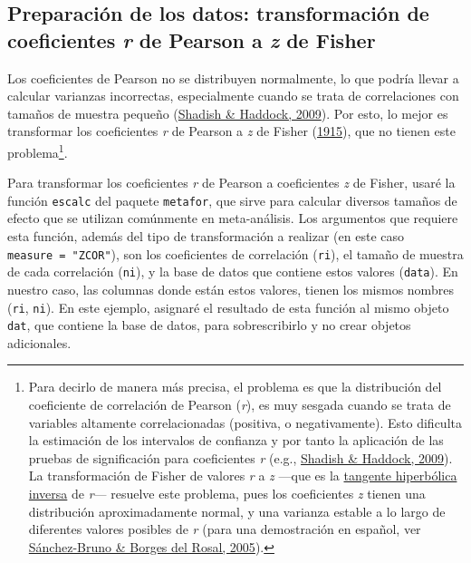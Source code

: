 \documentclass[
  bookmarksnumbered]{article}
\begin{document}
\hypertarget{preparaciuxf3n-de-los-datos-transformaciuxf3n-de-coeficientes-r-de-pearson-a-z-de-fisher}{%
\subsection{\texorpdfstring{Preparación de los datos: transformación de coeficientes \emph{r} de Pearson a \emph{z} de Fisher}{Preparación de los datos: transformación de coeficientes r de Pearson a z de Fisher}}\label{preparaciuxf3n-de-los-datos-transformaciuxf3n-de-coeficientes-r-de-pearson-a-z-de-fisher}}

Los coeficientes de Pearson no se distribuyen normalmente, lo que podría llevar a calcular varianzas incorrectas, especialmente cuando se trata de correlaciones con tamaños de muestra pequeño (\protect\hyperlink{ref-shadishCombiningEstimatesEffect2009}{Shadish \& Haddock, 2009}). Por esto, lo mejor es transformar los coeficientes \emph{r} de Pearson a \emph{z} de Fisher (\protect\hyperlink{ref-fisherFrequencyDistributionValues1915}{1915}), que no tienen este problema\footnote{Para decirlo de manera más precisa, el problema es que la distribución del coeficiente de correlación de Pearson (\emph{r}), es muy sesgada cuando se trata de variables altamente correlacionadas (positiva, o negativamente). Esto dificulta la estimación de los intervalos de confianza y por tanto la aplicación de las pruebas de significación para coeficientes \emph{r} (e.g., \protect\hyperlink{ref-shadishCombiningEstimatesEffect2009}{Shadish \& Haddock, 2009}). La transformación de Fisher de valores \emph{r} a \emph{z} ---que es la \href{https://es.wikipedia.org/wiki/Tangente_hiperb\%C3\%B3lica}{tangente hiperbólica inversa} de \emph{r}--- resuelve este problema, pues los coeficientes \emph{z} tienen una distribución aproximadamente normal, y una varianza estable a lo largo de diferentes valores posibles de \emph{r} (para una demostración en español, ver \protect\hyperlink{ref-sanchez-brunoTransformacionFisherPara2005}{Sánchez-Bruno \& Borges del Rosal, 2005}).}.

Para transformar los coeficientes \emph{r} de Pearson a coeficientes \emph{z} de Fisher, usaré la función \texttt{escalc} del paquete \texttt{metafor}, que sirve para calcular diversos tamaños de efecto que se utilizan comúnmente en meta-análisis. Los argumentos que requiere esta función, además del tipo de transformación a realizar (en este caso \texttt{measure\ =\ "ZCOR"}), son los coeficientes de correlación (\texttt{ri}), el tamaño de muestra de cada correlación (\texttt{ni}), y la base de datos que contiene estos valores (\texttt{data}). En nuestro caso, las columnas donde están estos valores, tienen los mismos nombres (\texttt{ri}, \texttt{ni}). En este ejemplo, asignaré el resultado de esta función al mismo objeto \texttt{dat}, que contiene la base de datos, para sobrescribirlo y no crear objetos adicionales.
\end{document}

